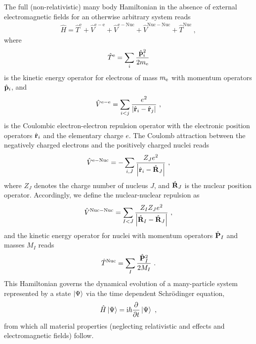 The full (non-relativistic) many body Hamiltonian in the absence of external electromagnetic fields for an otherwise arbitrary system reads
\begin{align}
    \hat{H}
        = \hat{{T}}^{\mathrm{e}}
        + \hat{{V}}^{\mathrm{e}-\mathrm{e}}
        + \hat{{V}}^{\mathrm{e}-\mathrm{Nuc}}
        + \hat{{V}}^{\mathrm{Nuc}-\mathrm{Nuc}}
        + \hat{{T}}^{\mathrm{Nuc}}~,
    \label{eq:Hamiltonian}
\end{align}
where
\begin{align}
    \hat T^{\rm e} 
        =\sum_{i} \frac{\hat{\mathbf{p}}_{i}^{2}}{2 m_{\rm e}}
    \label{eq:Te}
\end{align}
is the kinetic energy operator for electrons of mass $m_{\rm e}$ with momentum operators $\hat{\bf p}_i$, and 
\begin{align}
    \hat V^{\rm e-e}
        = \sum_{i < j} \frac{e^{2}}{\left|\hat{\b r}_{i}-\hat{\bf r}_{j}\right|}~,
    \label{eq:Ve}
\end{align}
is the Coulombic electron-electron repulsion operator with the electronic position operators $\hat{\bf r}_i$ and the elementary charge $e$. 
The Coulomb attraction between the negatively charged electrons and the positively charged nuclei reads
\begin{align}
    \hat V^{\rm e-Nuc}
        = -\sum_{i, J} \frac{Z_J e^{2}}{\left|\hat{\b r}_{i}-\hat{\bf R}_{J}\right|}~,
    \label{eq:Venuc}
\end{align}
where $Z_J$ denotes the charge number of nucleus $J$, and $\hat{\bf R}_J$ is the nuclear position operator. 
Accordingly, we define the nuclear-nuclear repulsion as
\begin{align}
    \hat V^{\rm Nuc-Nuc}
        = \sum_{I < J} \frac{Z_{I} Z_{J} e^{2}}{\left|\hat{\b R}_{I}-\hat{\bf R}_{J}\right|}~,
    \label{eq:Vnuc}
\end{align}
and the kinetic energy operator for nuclei with momentum operators $\hat{\bf P}_I$ and masses $M_I$ reads
\begin{align}
    \hat T^{\rm Nuc} 
        =\sum_{I} \frac{\hat{\mathbf{P}}_{I}^{2}}{2 M_{I}}~.
    \label{eq:Tnuc}
\end{align}
This Hamiltonian governs the dynamical evolution of a many-particle system represented by a state $\ket{\Psi}$ via the time dependent Schr\"odinger equation,
\begin{align}
	\hat H \ket{\Psi} = \im \hbar \frac{\partial}{\partial t} \ket{\Psi}~,
	\label{eq:TdSE}
\end{align}
from which all material properties (neglecting relativistic and effects and electromagnetic fields) follow.

